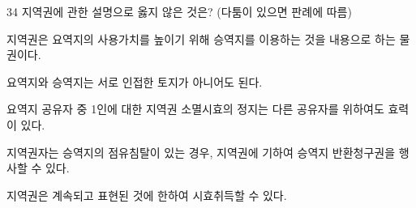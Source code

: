 \begin{question}{34}
지역권에 관한 설명으로 옳지 않은 것은? (다툼이 있으면 판례에 따름)
\begin{choices}
  \item 지역권은 요역지의 사용가치를 높이기 위해 승역지를 이용하는 것을 내용으로 하는 물권이다.
  \item 요역지와 승역지는 서로 인접한 토지가 아니어도 된다.
  \item 요역지 공유자 중 1인에 대한 지역권 소멸시효의 정지는 다른 공유자를 위하여도 효력이 있다.
  \item 지역권자는 승역지의 점유침탈이 있는 경우, 지역권에 기하여 승역지 반환청구권을 행사할 수 있다.
  \item 지역권은 계속되고 표현된 것에 한하여 시효취득할 수 있다.
\end{choices}
\end{question}

